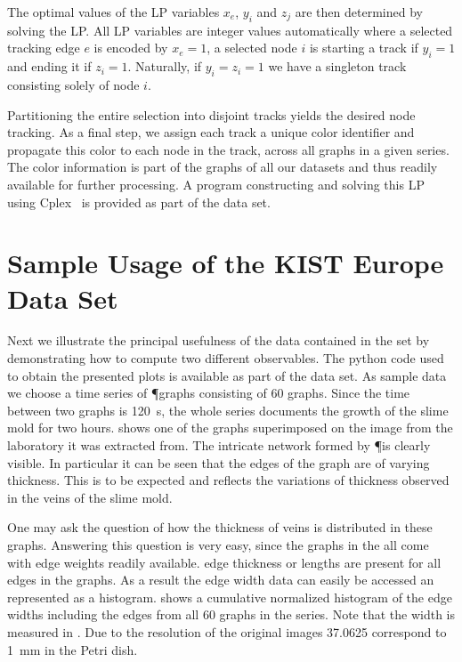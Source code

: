 		The optimal values of the LP variables $x_e$, $y_i$ and $z_j$ are then determined by solving the LP. All LP variables are integer values automatically where a selected tracking edge $e$ is encoded by $x_e=1$, a selected node $i$ is starting a track if $y_i=1$ and ending it if $z_i=1$. Naturally, if $y_i=z_i=1$ we have a singleton track consisting solely of node $i$.

		Partitioning the entire selection into disjoint tracks yields the desired node tracking. As a final step, we assign each track a unique color identifier and propagate this color to each node in the track, \ie across all graphs in a given series. The color information is part of the graphs of all our datasets and thus readily available for further processing. A program constructing and solving this LP using Cplex~\cite{cplex2005high} is provided as part of the data set.

\section{Sample Usage of the KIST Europe Data Set}

	Next we illustrate the principal usefulness of the data contained in the \data set by demonstrating how to compute two different observables. The python code used to obtain the presented plots is available as part of the data set. As sample data we choose a time series of \P graphs consisting of $60$ graphs. Since the time between two graphs is \SI{120}{\second}, the whole series documents the growth of the slime mold for two hours.  shows one of the graphs superimposed on the image from the laboratory it was extracted from. The intricate network formed by \P is clearly visible. In particular it can be seen that the edges of the graph are of varying thickness. This is to be expected and reflects the variations of thickness observed in the veins of the slime mold. 

	One may ask the question of how the thickness of veins is distributed in these graphs. Answering this question is very easy, since the graphs in the \data all come with edge weights readily available. \ie edge thickness or lengths are present for all edges in the graphs. As a result the edge width data can easily be accessed an represented as a histogram.  shows a cumulative normalized histogram of the edge widths including the edges from all $60$ graphs in the series. Note that the width is measured in \si{\pixel}. Due to the resolution of the original images \SI{37.0625}{\pixel} correspond to \SI{1}{\milli\metre} in the Petri dish.

